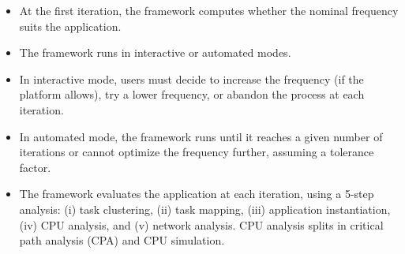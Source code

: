 \begin{frame}

	\begin{itemize}
		\item At the first iteration, the framework computes whether the nominal frequency suits the application. 
		
		\item The framework runs in interactive or automated modes. 
		
		\item In interactive mode, users must decide to increase the frequency (if the platform allows), try a lower frequency, or abandon the process at each iteration. 
		
		\item In automated mode, the framework runs until it reaches a given number of iterations or cannot optimize the frequency further, assuming a tolerance factor. 
		
		\item The framework evaluates the application at each iteration, using a 5-step analysis: (i) task clustering, (ii) task mapping, (iii) application instantiation, (iv) CPU analysis, and (v) network analysis. CPU analysis splits in critical path analysis (CPA) and CPU simulation.
	\end{itemize}

\end{frame}



